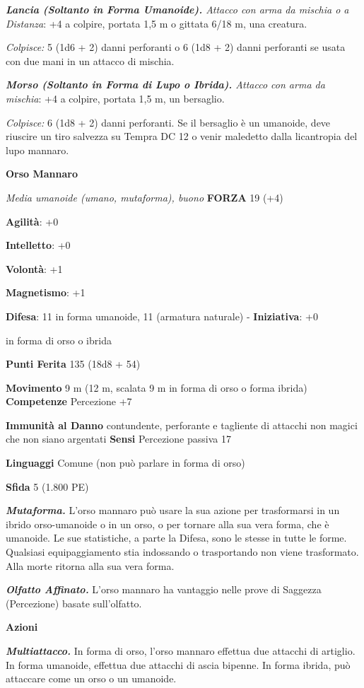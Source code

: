 \begin{multicols}{2}
\emph{\textbf{Lancia (Soltanto in Forma Umanoide).} Attacco con arma da
mischia o a Distanza}: +4 a colpire, portata 1,5 m o gittata 6/18 m, una
creatura.

\emph{Colpisce:} 5 (1d6 + 2) danni perforanti o 6 (1d8 + 2) danni
perforanti se usata con due mani in un attacco di mischia.

\emph{\textbf{Morso (Soltanto in Forma di Lupo o Ibrida).} Attacco con
arma da mischia}: +4 a colpire, portata 1,5 m, un bersaglio.

\emph{Colpisce:} 6 (1d8 + 2) danni perforanti. Se il bersaglio è un
umanoide, deve riuscire un tiro salvezza su Tempra DC 12 o venir
maledetto dalla licantropia del lupo mannaro.

\textbf{Orso Mannaro}

\emph{Media umanoide (umano, mutaforma), buono} \textbf{FORZA}
19 (+4)

\textbf{Agilità}: +0

\textbf{Intelletto}: +0

\textbf{Volontà}: +1

\textbf{Magnetismo}: +1

\textbf{Difesa}: 11 in forma umanoide, 11 (armatura naturale) - \textbf{Iniziativa}: +0

in forma di orso o ibrida

\textbf{Punti Ferita} 135 (18d8 + 54)

\textbf{Movimento} 9 m (12 m, scalata 9 m in forma di orso o forma
ibrida) \textbf{Competenze} Percezione +7

\textbf{Immunità al Danno} contundente, perforante e tagliente di
attacchi non magici che non siano argentati \textbf{Sensi} Percezione
passiva 17

\textbf{Linguaggi} Comune (non può parlare in forma di orso)

\textbf{Sfida} 5 (1.800 PE)

\emph{\textbf{Mutaforma.}} L'orso mannaro può usare la sua azione per
trasformarsi in un ibrido orso-umanoide o in un orso, o per tornare alla
sua vera forma, che è umanoide. Le sue statistiche, a parte la Difesa, sono
le stesse in tutte le forme. Qualsiasi equipaggiamento stia indossando o
trasportando non viene trasformato. Alla morte ritorna alla sua vera
forma.

\emph{\textbf{Olfatto Affinato.}} L'orso mannaro ha vantaggio nelle
prove di Saggezza (Percezione) basate sull'olfatto.

\textbf{Azioni}

\emph{\textbf{Multiattacco.}} In forma di orso, l'orso mannaro effettua
due attacchi di artiglio. In forma umanoide, effettua due attacchi di
ascia bipenne. In forma ibrida, può attaccare come un orso o un
umanoide.


\end{multicols}
